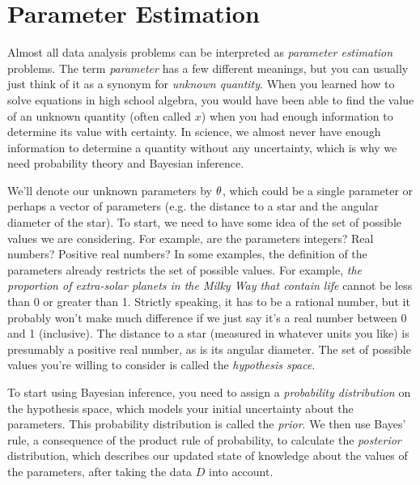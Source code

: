 \section{Parameter Estimation}
Almost all data analysis problems can be interpreted as {\it parameter
estimation} problems. The term {\it parameter} has a few different meanings,
but you can usually just think of it as a synonym for {\it unknown quantity}.
When you learned how to solve equations in high school algebra,
you would have been able to find the value of an unknown quantity
(often called $x$) when you had
enough information to determine its value with certainty.
In science, we almost never have enough information to determine a quantity
without any uncertainty, which is why we need probability theory and Bayesian
inference.

We'll denote our unknown parameters by $\theta$, which could be a single
parameter or perhaps a vector of parameters (e.g. the distance to a star
and the angular diameter of the star). To start, we
need to have some idea of the set of possible values we are considering. For
example, are the parameters integers? Real numbers? Positive real numbers?
In some examples, the definition of the parameters already restricts the set
of possible values. For example, {\it the proportion of extra-solar planets in
the Milky Way that contain life} cannot be less than 0 or greater than 1.
Strictly speaking, it has to be a rational number, but it probably won't make
much difference if we just say it's a real number between 0 and 1 (inclusive).
The distance to a star (measured in whatever units you like) is presumably a
positive real number, as is its angular diameter.
The set of possible values you're willing to consider is called the
{\it hypothesis space}.

To start using Bayesian inference, you need to assign a {\it probability
distribution} on the hypothesis space, which models your initial uncertainty
about the parameters. This probability distribution is called the {\it prior}.
We then use Bayes' rule, a consequence of the product rule of probability,
to calculate the {\it posterior} distribution, which describes our updated
state of knowledge about the values of the parameters, after taking the data
$D$ into account.

